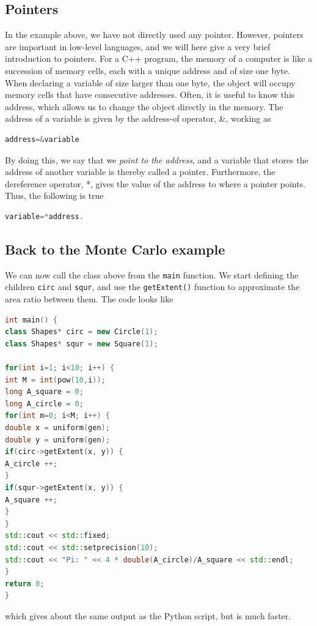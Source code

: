 \subsection{Pointers}
In the example above, we have not directly used any pointer. However, pointers are important in low-level languages, and we will here give a very brief introduction to pointers. For a C++ program, the memory of a computer is like a succession of memory cells, each with a unique address and of size one byte. When declaring a variable of size larger than one byte, the object will occupy memory cells that have consecutive addresses. Often, it is useful to know this address, which allows us to change the object directly in the memory. The address of a variable is given by the address-of operator, \&, working as
\lstset{basicstyle=\scriptsize}
\begin{lstlisting}[language=C++]
address=&variable
\end{lstlisting}
By doing this, we say that we \textit{point to the address}, and a variable that stores the address of another variable is thereby called a pointer. Furthermore, the dereference operator, *, gives the value of the address to where a pointer points. Thus, the following is true
\begin{lstlisting}[language=C++]
variable=*address.
\end{lstlisting}

\subsection{Back to the Monte Carlo example}
We can now call the class above from the \texttt{main} function. We start defining the children \texttt{circ} and \texttt{squr}, and use the \texttt{getExtent()} function to approximate the area ratio between them. The code looks like 
\begin{lstlisting}[language=c++]
int main() {   
class Shapes* circ = new Circle(1);
class Shapes* squr = new Square(1);

for(int i=1; i<10; i++) {
int M = int(pow(10,i));
long A_square = 0;
long A_circle = 0;
for(int m=0; i<M; i++) {
double x = uniform(gen);
double y = uniform(gen);
if(circ->getExtent(x, y)) {
A_circle ++;
}
if(squr->getExtent(x, y)) {
A_square ++;
}
}
std::cout << std::fixed;
std::cout << std::setprecision(10);
std::cout << "Pi: " << 4 * double(A_circle)/A_square << std::endl;
}
return 0;
}
\end{lstlisting}
which gives about the same output as the Python script, but is much faster. 

